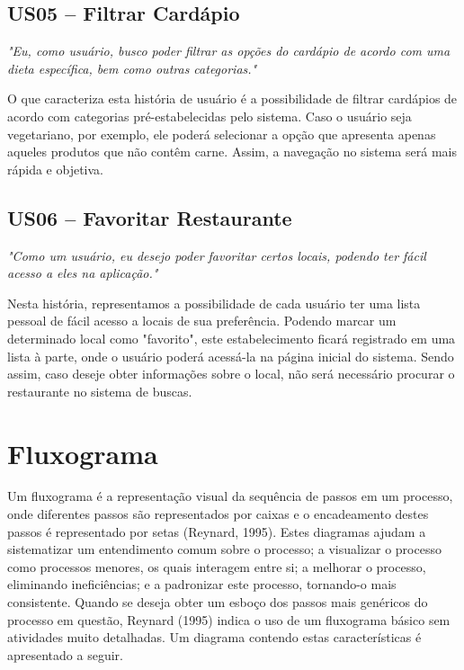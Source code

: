 \subsection{US05 -- Filtrar Cardápio}

\textit{"Eu, como usuário, busco poder filtrar as opções do cardápio de acordo com uma dieta específica, bem como outras categorias."}

O que caracteriza esta história de usuário é a possibilidade de filtrar cardápios de acordo com categorias pré-estabelecidas pelo sistema. Caso o usuário seja vegetariano, por exemplo, ele poderá selecionar a opção que apresenta apenas aqueles produtos que não contêm carne. Assim, a navegação no sistema será mais rápida e objetiva.

\subsection{US06 -- Favoritar Restaurante}

\textit{"Como um usuário, eu desejo poder favoritar certos locais, podendo ter fácil acesso a eles na aplicação."}

Nesta história, representamos a possibilidade de cada usuário ter uma lista pessoal de fácil acesso a locais de sua preferência. Podendo marcar um determinado local como "favorito", este estabelecimento ficará registrado em uma lista à parte, onde o usuário poderá acessá-la na página inicial do sistema. Sendo assim, caso deseje obter informações sobre o local, não será necessário procurar o restaurante no sistema de buscas.

\section{Fluxograma}
Um fluxograma é a representação visual da sequência de passos em um processo, onde diferentes passos são representados por caixas e o encadeamento destes passos é representado por setas (Reynard, 1995)\nocite{REYNARD1995}. Estes diagramas ajudam a sistematizar um entendimento comum sobre o processo; a visualizar o processo como processos menores, os quais interagem entre si; a melhorar o processo, eliminando ineficiências; e a padronizar este processo, tornando-o mais consistente. Quando se deseja obter um esboço dos passos mais genéricos do processo em questão, Reynard (1995) indica o uso de um fluxograma básico sem atividades muito detalhadas. Um diagrama contendo estas características é apresentado a seguir.

